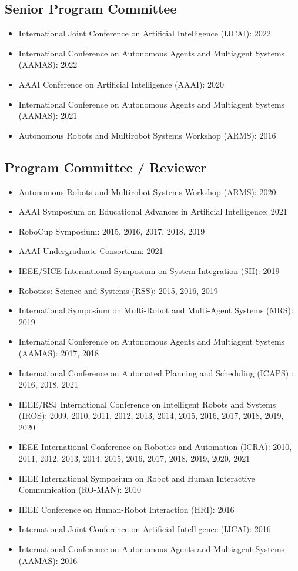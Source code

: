 \documentclass[Times]{article}
\begin{document}
\subsection*{Senior Program Committee}
\begin{itemize}
  \item International Joint Conference on Artificial Intelligence (IJCAI): 2022
  \item International Conference on Autonomous Agents and Multiagent Systems
  (AAMAS): 2022
  \item AAAI Conference on Artificial Intelligence (AAAI): 2020
  \item International Conference on Autonomous Agents and Multiagent Systems
  (AAMAS): 2021
  \item Autonomous Robots and Multirobot Systems Workshop (ARMS): 2016
\end{itemize}

\subsection*{Program Committee / Reviewer}
\begin{itemize}
 \item Autonomous Robots and Multirobot Systems Workshop (ARMS): 2020
 \item AAAI Symposium on Educational Advances in Artificial Intelligence: 2021
 \item RoboCup Symposium: 2015, 2016, 2017, 2018, 2019
 \item AAAI Undergraduate Consortium: 2021
 \item IEEE/SICE International Symposium on System Integration (SII): 2019
 \item Robotics: Science and Systems (RSS): 2015, 2016, 2019
 \item International Symposium on Multi-Robot and Multi-Agent Systems (MRS): 2019
 \item International Conference on Autonomous Agents and Multiagent Systems
(AAMAS): 2017, 2018
\item International Conference on Automated Planning and Scheduling (ICAPS)
 : 2016, 2018, 2021
 \item IEEE/RSJ International Conference on Intelligent Robots and Systems
(IROS): 2009, 2010, 2011, 2012, 2013, 2014, 2015, 2016, 2017, 2018, 2019, 2020
\item IEEE International Conference on Robotics and Automation (ICRA): 2010,
  2011, 2012, 2013, 2014, 2015, 2016, 2017, 2018, 2019, 2020, 2021
\item IEEE International Symposium on Robot and Human Interactive Communication
  (RO-MAN): 2010
 \item IEEE Conference on Human-Robot Interaction (HRI): 2016
 \item International Joint Conference on Artificial Intelligence (IJCAI): 2016
 \item International Conference on Autonomous Agents and Multiagent Systems
(AAMAS): 2016
\end{itemize}
\end{document}
